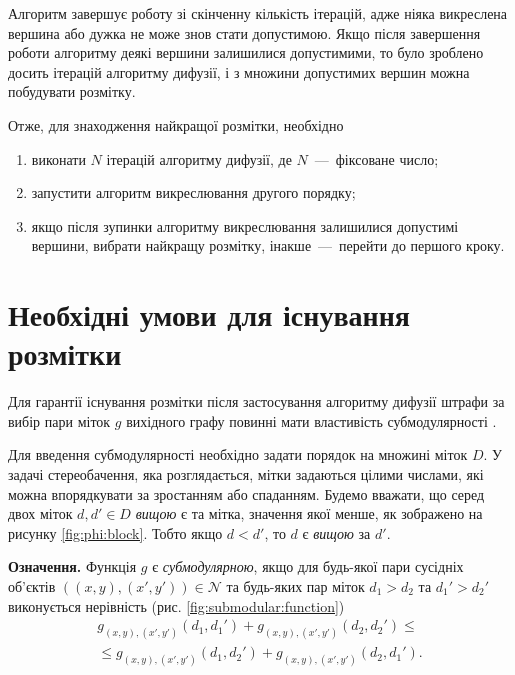 Алгоритм завершує роботу зі скінченну кількість ітерацій,
адже ніяка викреслена вершина або дужка не може знов стати допустимою.
Якщо після завершення роботи алгоритму деякі вершини залишилися допустимими,
то було зроблено досить ітерацій алгоритму дифузії,
і з множини допустимих вершин можна побудувати розмітку.

Отже, для знаходження найкращої розмітки, необхідно
\begin{enumerate}
    \item виконати $N$ ітерацій алгоритму дифузії, де $N$~---~фіксоване число;
    \item запустити алгоритм викреслювання другого порядку;
    \item якщо після зупинки алгоритму викреслювання залишилися
          допустимі вершини, вибрати найкращу розмітку,
          інакше~---~перейти до першого кроку.
\end{enumerate}

\section{Необхідні умови для існування розмітки}

Для гарантії існування
розмітки після застосування алгоритму дифузії штрафи за вибір пари міток $g$
вихідного графу повинні мати властивість субмодулярності
\cite{diffusion:shlezinger:supermodularity}.

Для введення субмодулярності необхідно задати порядок на множині міток $D$.
У задачі стереобачення, яка розглядається, мітки задаються цілими числами,
які можна впорядкувати за зростанням або спаданням.
Будемо вважати, що серед двох міток $d, d' \in D$ \textit{вищою} є та мітка,
значення якої менше, як зображено на рисунку \ref{fig:phi:block}.
Тобто якщо $d < d'$, то $d$ є \textit{вищою} за $d'$.

\textbf{Означення.}
Функція $g$ є \textit{субмодулярною}, якщо для будь-якої пари сусідніх об'єктів
$\left(\left(x, y \right), \left(x', y' \right) \right) \in \mathcal{N}$
та будь-яких пар міток $d_1 > d_2$ та $d_1' > d_2'$
виконується нерівність (рис. \ref{fig:submodular:function})
\begin{equation} \label{eq:submodular:function}
\begin{gathered}
    g_{\left(x, y \right), \left(x', y' \right)} \left(d_1, d_1' \right) +
    g_{\left(x, y \right), \left(x', y' \right)} \left(d_2, d_2' \right) \le \\
    \le g_{\left(x, y \right), \left(x', y' \right)} \left(d_1, d_2' \right) +
    g_{\left(x, y \right), \left(x', y' \right)} \left(d_2, d_1' \right).
\end{gathered}
\end{equation}

